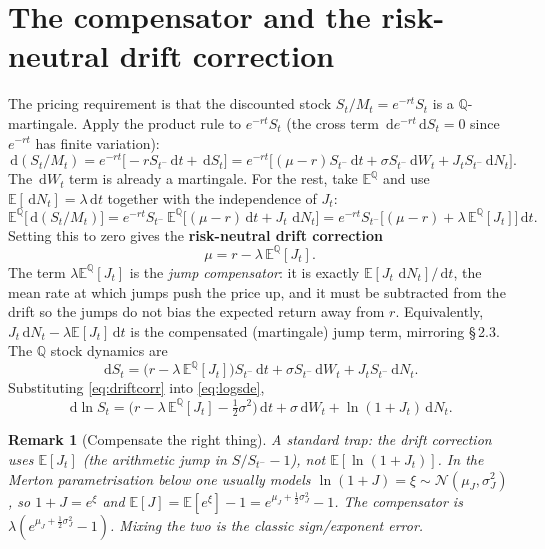 \documentclass[11pt]{article}
\newcommand{\E}{\mathbb{E}}
\newcommand{\dd}{\,\mathrm{d}}
\newtheorem{remark}{Remark}
\begin{document}
\section{The compensator and the risk-neutral drift correction}\label{sec:drift}
The pricing requirement is that the discounted stock $S_t/M_t=e^{-rt}S_t$ is a $\mathbb Q$-martingale.
Apply the product rule to $e^{-rt}S_t$ (the cross term $\dd e^{-rt}\dd S_t=0$ since $e^{-rt}$ has finite
variation):
\[
\dd(S_t/M_t)=e^{-rt}\big[-rS_{t^-}\dd t+\dd S_t\big]
=e^{-rt}\big[(\mu-r)S_{t^-}\dd t+\sigma S_{t^-}\dd W_t+J_tS_{t^-}\dd N_t\big].
\]
The $\dd W_t$ term is already a martingale. For the rest, take $\E^{\mathbb Q}$ and use
$\E[\dd N_t]=\lambda\dd t$ together with the independence of $J_t$:
\[
\E^{\mathbb Q}\big[\dd(S_t/M_t)\big]
=e^{-rt}S_{t^-}\,\E^{\mathbb Q}\big[(\mu-r)\dd t+J_t\,\dd N_t\big]
=e^{-rt}S_{t^-}\Big[(\mu-r)+\lambda\,\E^{\mathbb Q}[J_t]\Big]\dd t.
\]
Setting this to zero gives the \textbf{risk-neutral drift correction}
\begin{equation}\label{eq:driftcorr}
\boxed{\;\mu = r-\lambda\,\E^{\mathbb Q}[J_t].\;}
\end{equation}
The term $\lambda\E^{\mathbb Q}[J_t]$ is the \emph{jump compensator}: it is exactly $\E[J_t\,\dd N_t]/\dd t$,
the mean rate at which jumps push the price up, and it must be subtracted from the drift so the jumps do
not bias the expected return away from $r$. Equivalently, $J_t\dd N_t-\lambda\E[J_t]\dd t$ is the
compensated (martingale) jump term, mirroring \S\,2.3. The $\mathbb Q$ stock dynamics are
\[
\dd S_t=\big(r-\lambda\,\E^{\mathbb Q}[J_t]\big)S_{t^-}\dd t+\sigma S_{t^-}\dd W_t+J_tS_{t^-}\dd N_t.
\]
Substituting \eqref{eq:driftcorr} into \eqref{eq:logsde},
\begin{equation}\label{eq:logQ}
\dd\ln S_t=\Big(r-\lambda\,\E^{\mathbb Q}[J_t]-\tfrac12\sigma^2\Big)\dd t+\sigma\dd W_t+\ln(1+J_t)\dd N_t.
\end{equation}

\begin{remark}[Compensate the right thing]
A standard trap: the drift correction uses $\E[J_t]$ (the \emph{arithmetic} jump in $S/S_{t^-}-1$), not
$\E[\ln(1+J_t)]$. In the Merton parametrisation below one usually models $\ln(1+J)=\xi\sim\mathcal N(\mu_J,\sigma_J^2)$,
so $1+J=e^{\xi}$ and $\E[J]=\E[e^\xi]-1=e^{\mu_J+\frac12\sigma_J^2}-1$. The compensator is
$\lambda(e^{\mu_J+\frac12\sigma_J^2}-1)$. Mixing the two is the classic sign/exponent error.
\end{remark}
\end{document}
